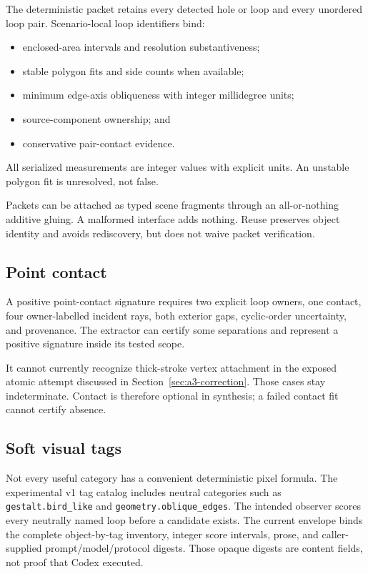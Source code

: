 \documentclass[11pt]{article}
\begin{document}
The deterministic packet retains every detected hole or loop and every
unordered loop pair.  Scenario-local loop identifiers bind:
\begin{itemize}[leftmargin=*]
  \item enclosed-area intervals and resolution substantiveness;
  \item stable polygon fits and side counts when available;
  \item minimum edge-axis obliqueness with integer millidegree units;
  \item source-component ownership; and
  \item conservative pair-contact evidence.
\end{itemize}
All serialized measurements are integer values with explicit units.  An
unstable polygon fit is unresolved, not false.

Packets can be attached as typed scene fragments through an all-or-nothing
additive gluing.  A malformed interface adds nothing.  Reuse preserves object
identity and avoids rediscovery, but does not waive packet verification.

\subsection{Point contact}

A positive point-contact signature requires two explicit loop owners, one
contact, four owner-labelled incident rays, both exterior gaps, cyclic-order
uncertainty, and provenance.  The extractor can certify some separations and
represent a positive signature inside its tested scope.

It cannot currently recognize thick-stroke vertex attachment in the exposed
atomic attempt discussed in Section~\ref{sec:a3-correction}.  Those cases stay
indeterminate.  Contact is therefore optional in synthesis; a failed contact
fit cannot certify absence.

\subsection{Soft visual tags}

Not every useful category has a convenient deterministic pixel formula.  The
experimental v1 tag catalog includes neutral categories such as
\texttt{gestalt.bird\_like} and \texttt{geometry.oblique\_edges}.  The
intended observer scores every neutrally named loop before a candidate exists.
The current envelope binds the complete object-by-tag inventory, integer score
intervals, prose, and caller-supplied prompt/model/protocol digests.  Those
opaque digests are content fields, not proof that Codex executed.
\end{document}
